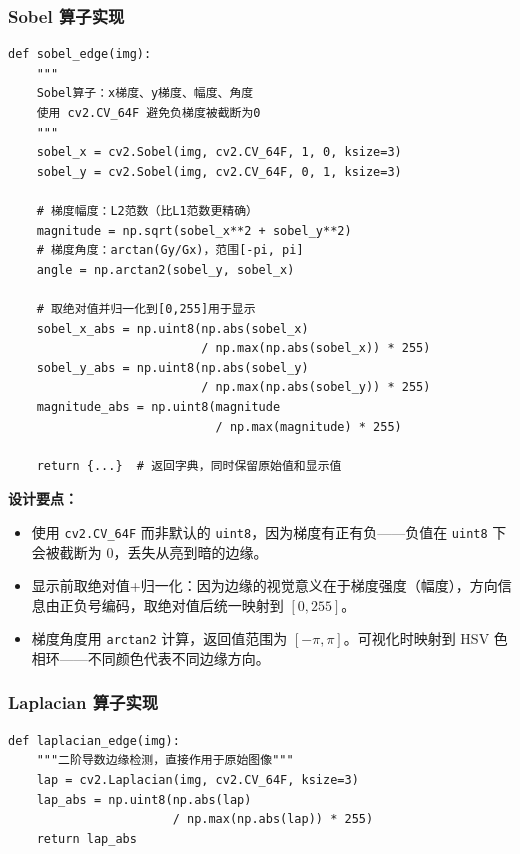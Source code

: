 \documentclass[12pt,a4paper]{ctexart}
\begin{document}
\subsubsection*{Sobel 算子实现}

\begin{lstlisting}[caption={Sobel算子：梯度计算与归一化}, label=lst:sobel]
def sobel_edge(img):
    """
    Sobel算子：x梯度、y梯度、幅度、角度
    使用 cv2.CV_64F 避免负梯度被截断为0
    """
    sobel_x = cv2.Sobel(img, cv2.CV_64F, 1, 0, ksize=3)
    sobel_y = cv2.Sobel(img, cv2.CV_64F, 0, 1, ksize=3)

    # 梯度幅度：L2范数（比L1范数更精确）
    magnitude = np.sqrt(sobel_x**2 + sobel_y**2)
    # 梯度角度：arctan(Gy/Gx)，范围[-pi, pi]
    angle = np.arctan2(sobel_y, sobel_x)

    # 取绝对值并归一化到[0,255]用于显示
    sobel_x_abs = np.uint8(np.abs(sobel_x)
                           / np.max(np.abs(sobel_x)) * 255)
    sobel_y_abs = np.uint8(np.abs(sobel_y)
                           / np.max(np.abs(sobel_y)) * 255)
    magnitude_abs = np.uint8(magnitude
                             / np.max(magnitude) * 255)

    return {...}  # 返回字典，同时保留原始值和显示值
\end{lstlisting}

\textbf{设计要点：}
\begin{itemize}
    \item 使用 \texttt{cv2.CV\_64F} 而非默认的 \texttt{uint8}，因为梯度有正有负——负值在 \texttt{uint8} 下会被截断为 0，丢失从亮到暗的边缘。
    \item 显示前取绝对值+归一化：因为边缘的视觉意义在于梯度强度（幅度），方向信息由正负号编码，取绝对值后统一映射到 $[0,255]$。
    \item 梯度角度用 \texttt{arctan2} 计算，返回值范围为 $[-\pi, \pi]$。可视化时映射到 HSV 色相环——不同颜色代表不同边缘方向。
\end{itemize}

\subsubsection*{Laplacian 算子实现}

\begin{lstlisting}[caption={Laplacian算子}, label=lst:laplacian]
def laplacian_edge(img):
    """二阶导数边缘检测，直接作用于原始图像"""
    lap = cv2.Laplacian(img, cv2.CV_64F, ksize=3)
    lap_abs = np.uint8(np.abs(lap)
                       / np.max(np.abs(lap)) * 255)
    return lap_abs
\end{lstlisting}
\end{document}
